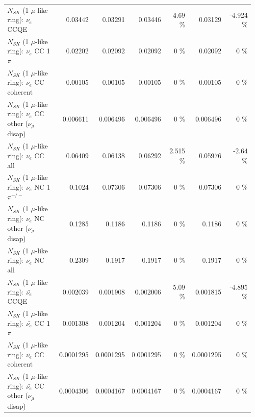 \begin{table}
\begin{tabular}{| l | r | r | r  r | r  r |}
\hline
\hline
\hline
                                      $N_{SK}$ (1 $\mu$-like ring): $\nu_e$ CCQE &         0.03442 &         0.03291 &         0.03446 &     4.69 \%  &         0.03129 &   -4.924 \%  \\ 
                                 $N_{SK}$ (1 $\mu$-like ring): $\nu_e$ CC 1$\pi$ &         0.02202 &         0.02092 &         0.02092 &        0 \%  &         0.02092 &        0 \%  \\ 
                               $N_{SK}$ (1 $\mu$-like ring): $\nu_e$ CC coherent &         0.00105 &         0.00105 &         0.00105 &        0 \%  &         0.00105 &        0 \%  \\ 
                $N_{SK}$ (1 $\mu$-like ring): $\nu_e$ CC other ($\nu_\mu$ disap) &        0.006611 &        0.006496 &        0.006496 &        0 \%  &        0.006496 &        0 \%  \\ 
                                  $N_{SK}$ (1 $\mu$-like ring): $\nu_{e}$ CC all &         0.06409 &         0.06138 &         0.06292 &    2.515 \%  &         0.05976 &    -2.64 \%  \\ 
\hline
                           $N_{SK}$ (1 $\mu$-like ring): $\nu_e$ NC 1$\pi^{+/-}$ &          0.1024 &         0.07306 &         0.07306 &        0 \%  &         0.07306 &        0 \%  \\ 
                $N_{SK}$ (1 $\mu$-like ring): $\nu_e$ NC other ($\nu_\mu$ disap) &          0.1285 &          0.1186 &          0.1186 &        0 \%  &          0.1186 &        0 \%  \\ 
                                  $N_{SK}$ (1 $\mu$-like ring): $\nu_{e}$ NC all &          0.2309 &          0.1917 &          0.1917 &        0 \%  &          0.1917 &        0 \%  \\ 
\hline
\hline
\hline
                                $N_{SK}$ (1 $\mu$-like ring): $\bar{\nu_e}$ CCQE &        0.002039 &        0.001908 &        0.002006 &     5.09 \%  &        0.001815 &   -4.895 \%  \\ 
                           $N_{SK}$ (1 $\mu$-like ring): $\bar{\nu_e}$ CC 1$\pi$ &        0.001308 &        0.001204 &        0.001204 &        0 \%  &        0.001204 &        0 \%  \\ 
                         $N_{SK}$ (1 $\mu$-like ring): $\bar{\nu_e}$ CC coherent &       0.0001295 &       0.0001295 &       0.0001295 &        0 \%  &       0.0001295 &        0 \%  \\ 
          $N_{SK}$ (1 $\mu$-like ring): $\bar{\nu_e}$ CC other ($\nu_\mu$ disap) &       0.0004306 &       0.0004167 &       0.0004167 &        0 \%  &       0.0004167 &        0 \%  \\ 

\end{tabular}
\end{table}
